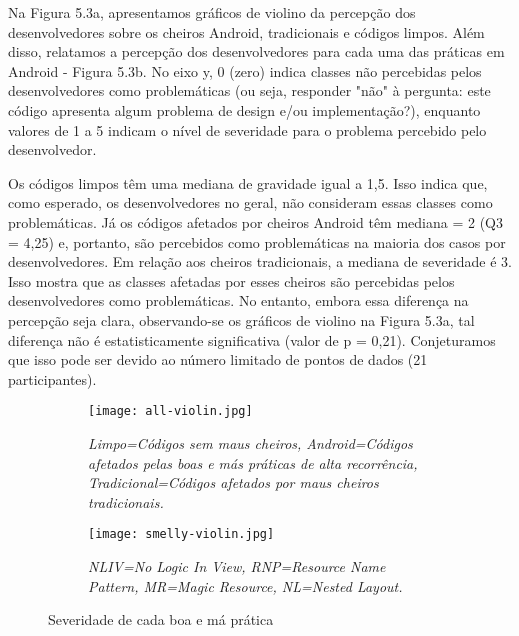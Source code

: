Na Figura 5.3a, apresentamos gráficos de violino da percepção dos desenvolvedores sobre os cheiros Android, tradicionais e códigos limpos. Além disso, relatamos a percepção dos desenvolvedores para cada uma das práticas em Android - Figura 5.3b. No eixo y, 0 (zero) indica classes não percebidas pelos desenvolvedores como problemáticas (ou seja, responder "não" à pergunta: este código apresenta algum problema de design e/ou implementação?), enquanto valores de 1 a 5 indicam o nível de severidade para o problema percebido pelo desenvolvedor.

Os códigos limpos têm uma mediana de gravidade igual a 1,5. Isso indica que, como esperado, os desenvolvedores no geral, não consideram essas classes como problemáticas. Já os códigos afetados por cheiros Android têm mediana = 2 (Q3 = 4,25) e, portanto, são percebidos como problemáticas na maioria dos casos por desenvolvedores. Em relação aos cheiros tradicionais, a mediana de severidade é 3. Isso mostra que as classes afetadas por esses cheiros são percebidas pelos desenvolvedores como problemáticas. No entanto, embora essa diferença na percepção seja clara, observando-se os gráficos de violino na Figura 5.3a, tal diferença não é estatisticamente significativa (valor de p = 0,21). Conjeturamos que isso pode ser devido ao número limitado de pontos de dados (21 participantes).


\begin{figure*}
\centering
\begin{subfigure}{.4\textwidth}
  \centering
  \texttt{[image: all-violin.jpg]}
  \caption{\footnotesize{\textit{Limpo=Códigos sem maus cheiros, Android=Códigos afetados pelas boas e más práticas de alta recorrência, Tradicional=Códigos afetados por maus cheiros tradicionais.}}}
  \label{fig:sub2}
\end{subfigure}%
\hspace{5mm}
\begin{subfigure}{.4\textwidth}
  \centering
  \texttt{[image: smelly-violin.jpg]}
  \caption{\footnotesize{\textit{NLIV=No Logic In View, RNP=Resource Name Pattern, MR=Magic Resource, NL=Nested Layout.}}}
  \label{fig:sub1}
\end{subfigure}
\caption{Severidade de cada boa e má prática}
\label{fig:test}
\end{figure*}


